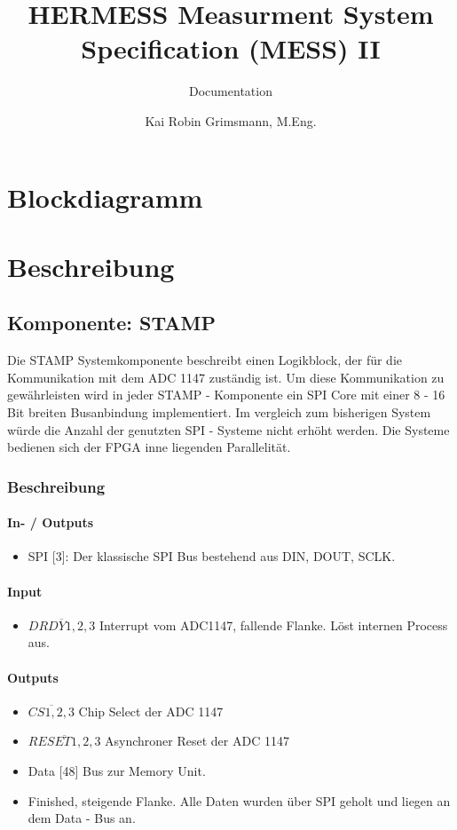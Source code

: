 \documentclass{scrreprt}
\title{HERMESS Measurment System Specification (MESS) II }
\subtitle{Documentation}
\author{Kai Robin Grimsmann, M.Eng.}
\begin{document}

\thispagestyle{empty}
\tableofcontents 
\pagebreak
\chapter{Blockdiagramm}




\chapter{Beschreibung}
\section{Komponente: STAMP}
Die STAMP Systemkomponente beschreibt einen Logikblock, der für die Kommunikation mit dem ADC 1147 zuständig ist. Um diese Kommunikation zu gewährleisten wird in jeder STAMP - Komponente ein SPI Core mit einer 8 - 16 Bit breiten  Busanbindung implementiert. Im vergleich zum bisherigen System würde die Anzahl der genutzten SPI - Systeme nicht erhöht werden. Die Systeme bedienen sich der FPGA inne liegenden Parallelität. 
\subsection{Beschreibung} 
\subsubsection{In- / Outputs}
\begin{itemize}
\item SPI [3]: Der klassische SPI Bus bestehend aus DIN, DOUT, SCLK.
\end{itemize}
\subsubsection{Input}
\begin{itemize}
\item $\overline{DRDY1,2,3}$ Interrupt vom ADC1147, fallende Flanke. Löst internen Process aus.  
\end{itemize}
\subsubsection{Outputs}
\begin{itemize}
\item $\overline{CS1,2,3} $ Chip Select der ADC 1147
\item $\overline{RESET1,2,3}$ Asynchroner Reset der ADC 1147
\item Data [48] Bus zur Memory Unit. 
\item Finished, steigende Flanke. Alle Daten wurden über SPI geholt und liegen an dem Data - Bus an. 
\end{itemize}
\end{document}
